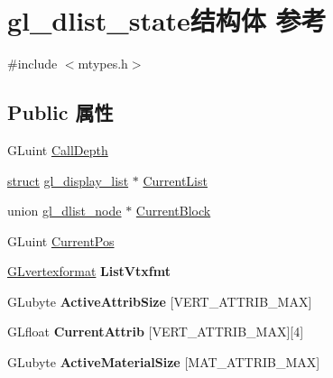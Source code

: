 \hypertarget{structgl__dlist__state}{}\section{gl\+\_\+dlist\+\_\+state结构体 参考}
\label{structgl__dlist__state}


{\ttfamily \#include $<$mtypes.\+h$>$}

\subsection*{Public 属性}
\begin{DoxyCompactItemize}
\item 
G\+Luint \hyperlink{structgl__dlist__state_ad0b0d1c41400e2b6ccf8f41982b8e2b3}{Call\+Depth}
\item 
\hyperlink{interfacestruct}{struct} \hyperlink{structgl__display__list}{gl\+\_\+display\+\_\+list} $\ast$ \hyperlink{structgl__dlist__state_ad49d54087619ca45b768ed4b242092c6}{Current\+List}
\item 
union \hyperlink{uniongl__dlist__node}{gl\+\_\+dlist\+\_\+node} $\ast$ \hyperlink{structgl__dlist__state_acf61ddd3ff8183981b8a90f3f8a1234f}{Current\+Block}
\item 
G\+Luint \hyperlink{structgl__dlist__state_a6a87a383653895dc2bd5c65b13ecc877}{Current\+Pos}
\item 
\mbox{\label{structgl__dlist__state_a0e2a7dd8bde8c883100c1861c580fb60}} 
\hyperlink{struct_g_lvertexformat}{G\+Lvertexformat} {\bfseries List\+Vtxfmt}
\item 
\mbox{\label{structgl__dlist__state_aecf766ec2101ba3b360d2f6de7d1c20e}} 
G\+Lubyte {\bfseries Active\+Attrib\+Size} \mbox{[}V\+E\+R\+T\+\_\+\+A\+T\+T\+R\+I\+B\+\_\+\+M\+AX\mbox{]}
\item 
\mbox{\label{structgl__dlist__state_a6409ba08372e77370132a2d554c5bf2e}} 
G\+Lfloat {\bfseries Current\+Attrib} \mbox{[}V\+E\+R\+T\+\_\+\+A\+T\+T\+R\+I\+B\+\_\+\+M\+AX\mbox{]}\mbox{[}4\mbox{]}
\item 
\mbox{\label{structgl__dlist__state_af8cc35869153c24a0b9d3fa56e4967f0}} 
G\+Lubyte {\bfseries Active\+Material\+Size} \mbox{[}M\+A\+T\+\_\+\+A\+T\+T\+R\+I\+B\+\_\+\+M\+AX\mbox{]}
\item 

\end{DoxyCompactItemize}

